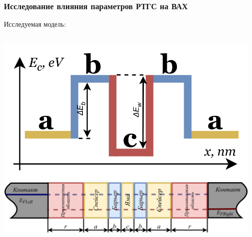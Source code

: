 \documentclass[10pt,pdf,hyperref={unicode},aspectratio={169}]{beamer}
\begin{document}


\begin{frame}
	\frametitle{Исследование влияния параметров РТГС на ВАХ}
	{\color{blue} Исследуемая модель:}
	\begin{columns}
	   	\includegraphics[width=\linewidth]{assets/BD}
	   	\includegraphics[width=\linewidth]{assets/RTHS}
	\end{columns}


\end{frame}
\end{document}
